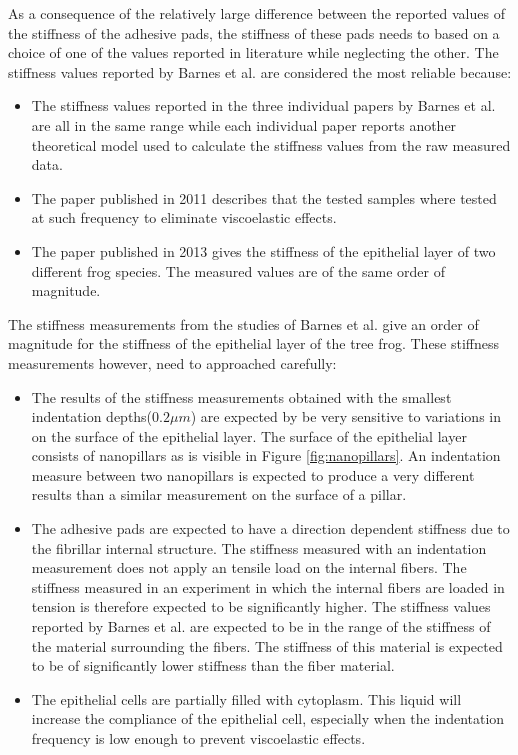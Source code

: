  \qquad As a consequence of the relatively large difference between the reported values of the stiffness of the adhesive pads, the stiffness of these pads needs to based on a choice of one of the values reported in literature while neglecting the other. The stiffness values reported by Barnes et al. are considered the most reliable because:
 \begin{itemize}
     \item The stiffness values reported in the three individual papers by Barnes et al. are all in the same range while each individual paper reports another theoretical model used to calculate the stiffness values from the raw measured data.
     \item The paper published in 2011 describes that the tested samples where tested at such frequency to eliminate viscoelastic effects. 
     \item The paper published in 2013 gives the stiffness of the epithelial layer of two different frog species. The measured values are of the same order of magnitude.
 \end{itemize}

\qquad The stiffness measurements from the studies of Barnes et al. give an order of magnitude for the stiffness of the epithelial layer of the tree frog. These stiffness measurements however, need to approached carefully:
\begin{itemize}
    \item The results of the stiffness measurements obtained with the smallest indentation depths($0.2 \mu m$) are expected by be very sensitive to variations in on the surface of the epithelial layer. The surface of the epithelial layer consists of nanopillars as is visible in Figure \ref{fig:nanopillars}. An indentation measure between two nanopillars is expected to produce a very different results than a similar measurement on the surface of a pillar.
    \item The adhesive pads are expected to have a direction dependent stiffness due to the fibrillar internal structure. The stiffness measured with an indentation measurement does not apply an tensile load on the internal fibers. The stiffness measured in an experiment in which the internal fibers are loaded in tension is therefore expected to be significantly higher. The stiffness values reported by Barnes et al. are expected to be in the range of the stiffness of the material surrounding the fibers. The stiffness of this material is expected to be of significantly lower stiffness than the fiber material. 
    \item The epithelial cells are partially filled with cytoplasm. This liquid will increase the compliance of the epithelial cell, especially when the indentation frequency is low enough to prevent viscoelastic effects.
\end{itemize}

